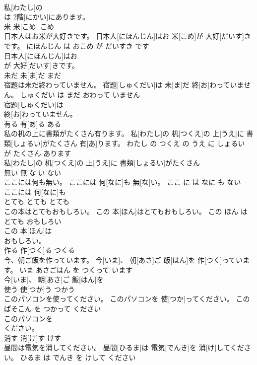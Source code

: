 \documentclass[8pt]{extreport}
\begin{document}
\begin{CJK}{UTF8}{min}
\\	私[わたし]の
\\	は 2階[にかい]にあります。			
\\	米	米[こめ]	こめ	
\\	日本人はお米が大好きです。	日本人[にほんじん]はお 米[こめ]が 大好[だいす]きです。	にほんじん は おこめ が だいすき です	
\\	日本人[にほんじん]はお
\\	が 大好[だいす]きです。			
\\	未だ	未[ま]だ	まだ	
\\	宿題は未だ終わっていません。	宿題[しゅくだい]は 未[ま]だ 終[お]わっていません。	しゅくだい は まだ おわって いません	
\\	宿題[しゅくだい]は
\\	終[お]わっていません。			
\\	有る	有[あ]る	ある	
\\	私の机の上に書類がたくさん有ります。	私[わたし]の 机[つくえ]の 上[うえ]に 書類[しょるい]がたくさん 有[あ]ります。	わたし の つくえ の うえ に しょるい が たくさん あります	
\\	私[わたし]の 机[つくえ]の 上[うえ]に 書類[しょるい]がたくさん
\\	無い	無[な]い	ない	
\\	ここには何も無い。	ここには 何[なに]も 無[な]い。	ここ に は なに も ない	
\\	ここには 何[なに]も
\\	とても	とても	とても	
\\	この本はとてもおもしろい。	この 本[ほん]はとてもおもしろい。	この ほん は とても おもしろい	
\\	この 本[ほん]は
\\	おもしろい。			
\\	作る	作[つく]る	つくる	
\\	今、朝ご飯を作っています。	今[いま]、 朝[あさ]ご 飯[はん]を 作[つく]っています。	いま あさごはん を つくって います	
\\	今[いま]、 朝[あさ]ご 飯[はん]を
\\	使う	使[つか]う	つかう	
\\	このパソコンを使ってください。	このパソコンを 使[つか]ってください。	この ぱそこん を つかって ください	
\\	このパソコンを
\\	ください。			
\\	消す	消[け]す	けす	
\\	昼間は電気を消してください。	昼間[ひるま]は 電気[でんき]を 消[け]してください。	ひるま は でんき を けして ください	

\end{CJK}
\end{document}

